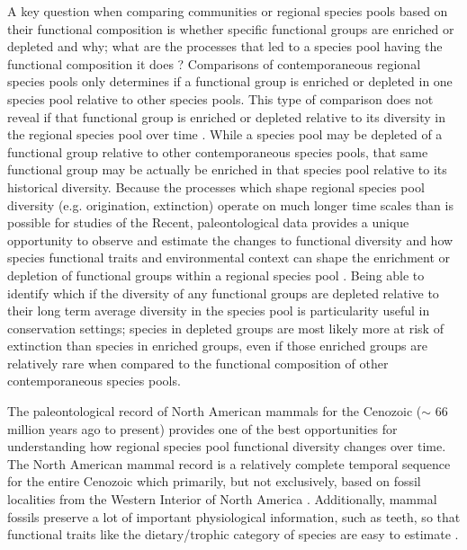 A key question when comparing communities or regional species pools based on their functional composition is whether specific functional groups are enriched or depleted and why; what are the processes that led to a species pool having the functional composition it does \citep{Mcgill2006,Weber2017,Brown1989,Smith2008b,Blois2009}? Comparisons of contemporaneous regional species pools only determines if a functional group is enriched or depleted in one species pool relative to other species pools. This type of comparison does not reveal if that functional group is enriched or depleted relative to its diversity in the regional species pool over time \citep{Blois2009}. While a species pool may be depleted of a functional group relative to other contemporaneous species pools, that same functional group may be actually be enriched in that species pool relative to its historical diversity. Because the processes which shape regional species pool diversity (e.g. origination, extinction) operate on much longer time scales than is possible for studies of the Recent, paleontological data provides a unique opportunity to observe and estimate the changes to functional diversity and how species functional traits and environmental context can shape the enrichment or depletion of functional groups within a regional species pool \citep{Blois2009,Smith2008b}. Being able to identify which if the diversity of any functional groups are depleted relative to their long term average diversity in the species pool is particularity useful in conservation settings; species in depleted groups are most likely more at risk of extinction than species in enriched groups, even if those enriched groups are relatively rare when compared to the functional composition of other contemporaneous species pools.

The paleontological record of North American mammals for the Cenozoic (\(\sim\) 66 million years ago to present) provides one of the best opportunities for understanding how regional species pool functional diversity changes over time. The North American mammal record is a relatively complete temporal sequence for the entire Cenozoic which primarily, but not exclusively, based on fossil localities from the Western Interior of North America \citep{Alroy1996a,Alroy2000g,Alroy2009}. Additionally, mammal fossils preserve a lot of important physiological information, such as teeth, so that functional traits like the dietary/trophic category of species are easy to estimate \citep{Polly2015a,Polly2011b,Eronen2010a}.


